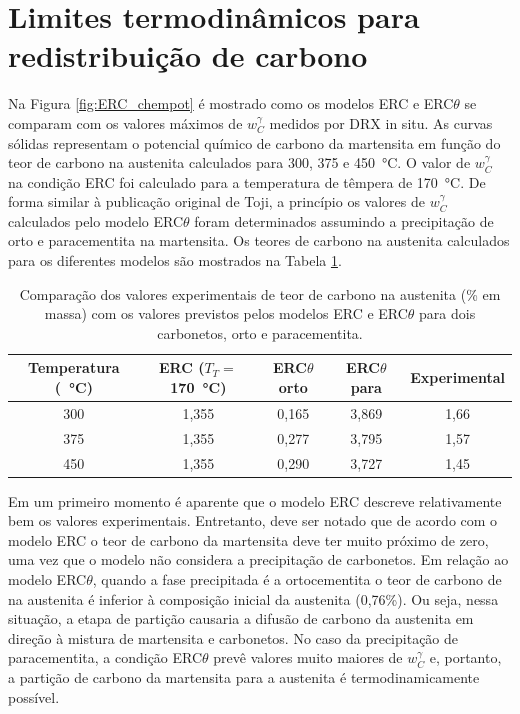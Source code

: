 \section{Limites termodinâmicos para redistribuição de carbono}


Na Figura \ref{fig:ERC_chempot} é mostrado como os modelos ERC e ERC$\theta$ se comparam com os valores máximos de $w_C^\gamma$ medidos por DRX in situ. As curvas sólidas representam o potencial químico de carbono da martensita em função do teor de carbono na austenita calculados para 300, 375 e \SI{450}{\degreeCelsius}. O valor de $w_C^\gamma$ na condição ERC foi calculado para a temperatura de têmpera de \SI{170}{\degreeCelsius}. De forma similar à publicação original de Toji\cite{Toji2015}, a princípio os valores de $w_C^\gamma$ calculados pelo modelo ERC$\theta$ foram determinados assumindo a precipitação de orto e paracementita na martensita. Os teores de carbono na austenita calculados para os diferentes modelos são mostrados na Tabela \ref{tab:ERCtheta}.

\begin{table}
  \centering
  \caption{Comparação dos valores experimentais de teor de carbono na austenita (\% em massa) com os valores previstos pelos modelos ERC e ERC$\theta$ para dois carbonetos, orto e paracementita.}
  \begin{tabular}{ccccc}
    \hline
      Temperatura (\SI{}{\degreeCelsius}) & ERC ($T_T=$\SI{170}{\degreeCelsius}) & ERC$\theta$ orto & ERC$\theta$ para & Experimental \\
    \hline
      300 & 1,355 & 0,165 & 3,869 & 1,66 \\
      375 & 1,355 & 0,277 & 3,795 & 1,57 \\
      450 & 1,355 & 0,290 & 3,727 & 1,45 \\
    \hline
  \end{tabular}
  \label{tab:ERCtheta}
\end{table}

Em um primeiro momento é aparente que o modelo ERC descreve relativamente bem os valores experimentais. Entretanto, deve ser notado que de acordo com o modelo ERC o teor de carbono da martensita deve ter muito próximo de zero, uma vez que o modelo não considera a precipitação de carbonetos. Em relação ao modelo ERC$\theta$, quando a fase precipitada é a ortocementita o teor de carbono de na austenita é inferior à composição inicial da austenita (0,76\%). Ou seja, nessa situação, a etapa de partição causaria a difusão de carbono da austenita em direção à mistura de martensita e carbonetos. No caso da precipitação de paracementita, a condição ERC$\theta$ prevê valores muito maiores de $w_C^\gamma$ e, portanto, a partição de carbono da martensita para a austenita é termodinamicamente possível.


